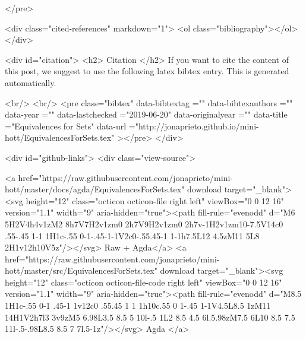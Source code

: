 </pre>


  <div class="cited-references" markdown="1">
  <ol class="bibliography"></ol>
  </div>


  
  <div id="citation">
  <h2> Citation </h2>
  If you want to cite the content of this post,
  we suggest to use the following latex bibtex entry.
  This is generated automatically.

  <br/>
  <br/>
  <pre class="bibtex"
       data-bibtextag =""
       data-bibtexauthors =""
       data-year =""
       data-lastchecked ="2019-06-20"
       data-originalyear =""
       data-title ="Equivalences for Sets"
       data-url ="http://jonaprieto.github.io/mini-hott/EquivalencesForSets.tex"
  ></pre>
  </div>
  

  <div id="github-links">
    <div class="view-source">
      
        <a href="https://raw.githubusercontent.com/jonaprieto/mini-hott/master/docs/agda/EquivalencesForSets.tex" download target="_blank"><svg height="12" class="octicon octicon-file right left" viewBox="0 0 12 16" version="1.1" width="9" aria-hidden="true"><path fill-rule="evenodd" d="M6 5H2V4h4v1zM2 8h7V7H2v1zm0 2h7V9H2v1zm0 2h7v-1H2v1zm10-7.5V14c0 .55-.45 1-1 1H1c-.55 0-1-.45-1-1V2c0-.55.45-1 1-1h7.5L12 4.5zM11 5L8 2H1v12h10V5z"/></svg> Raw + Agda</a>
        <a href="https://raw.githubusercontent.com/jonaprieto/mini-hott/master/src/EquivalencesForSets.tex" download target="_blank"><svg height="12" class="octicon octicon-file-code right left" viewBox="0 0 12 16" version="1.1" width="9" aria-hidden="true"><path fill-rule="evenodd" d="M8.5 1H1c-.55 0-1 .45-1 1v12c0 .55.45 1 1 1h10c.55 0 1-.45 1-1V4.5L8.5 1zM11 14H1V2h7l3 3v9zM5 6.98L3.5 8.5 5 10l-.5 1L2 8.5 4.5 6l.5.98zM7.5 6L10 8.5 7.5 11l-.5-.98L8.5 8.5 7 7l.5-1z"/></svg> Agda </a>
      
